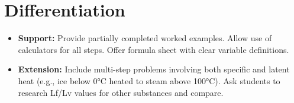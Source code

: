 \documentclass[11pt, a4paper]{article}
\begin{document}
\section*{Differentiation}
\begin{itemize}
    \item \textbf{Support:} Provide partially completed worked examples. Allow use of calculators for all steps. Offer formula sheet with clear variable definitions.
    \item \textbf{Extension:} Include multi-step problems involving both specific and latent heat (e.g., ice below 0°C heated to steam above 100°C). Ask students to research Lf/Lv values for other substances and compare.
\end{itemize}
\end{document}
